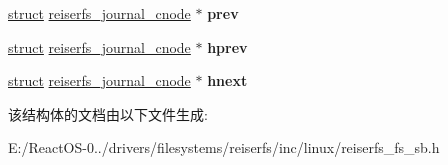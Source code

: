 \begin{DoxyCompactItemize}
\hyperlink{interfacestruct}{struct} \hyperlink{structreiserfs__journal__cnode}{reiserfs\+\_\+journal\+\_\+cnode} $\ast$ {\bfseries prev}
\item 
\mbox{\label{structreiserfs__journal__cnode_a1fc89fefba889d7d8306e02589da987c}} 
\hyperlink{interfacestruct}{struct} \hyperlink{structreiserfs__journal__cnode}{reiserfs\+\_\+journal\+\_\+cnode} $\ast$ {\bfseries hprev}
\item 
\mbox{\label{structreiserfs__journal__cnode_ad5ce4dc25327c329846b7d4b77c7a102}} 
\hyperlink{interfacestruct}{struct} \hyperlink{structreiserfs__journal__cnode}{reiserfs\+\_\+journal\+\_\+cnode} $\ast$ {\bfseries hnext}
\end{DoxyCompactItemize}


该结构体的文档由以下文件生成\+:\begin{DoxyCompactItemize}
\item 
E\+:/\+React\+O\+S-\/0../drivers/filesystems/reiserfs/inc/linux/reiserfs\+\_\+fs\+\_\+sb.\+h\end{DoxyCompactItemize}

